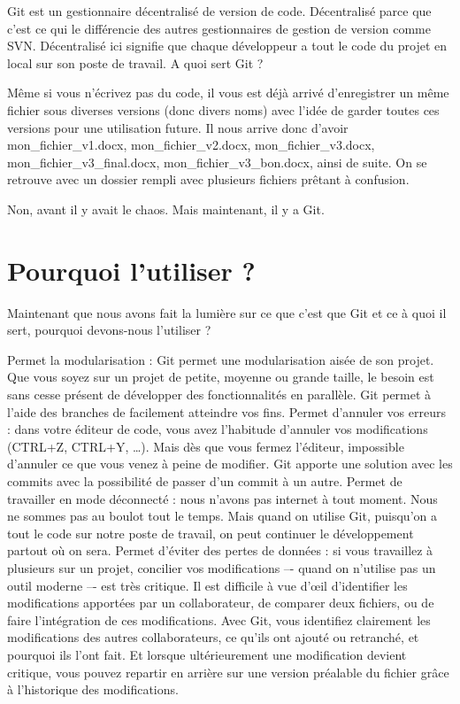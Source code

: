 \documentclass[11pt, a4paper]{book}
\begin{document}
Git est un gestionnaire décentralisé de version de code. Décentralisé parce que c’est ce qui le différencie des autres gestionnaires de gestion de version comme SVN. Décentralisé ici signifie que chaque développeur a tout le code du projet en local sur son poste de travail.
A quoi sert Git ?

Même si vous n’écrivez pas du code, il vous est déjà arrivé d’enregistrer un même fichier sous diverses versions (donc divers noms) avec l’idée de garder toutes ces versions pour une utilisation future. Il nous arrive donc d’avoir mon\_fichier\_v1.docx, mon\_fichier\_v2.docx, mon\_fichier\_v3.docx, mon\_fichier\_v3\_final.docx, mon\_fichier\_v3\_bon.docx, ainsi de suite. On se retrouve avec un dossier rempli avec plusieurs fichiers prêtant à confusion.

Non, avant il y avait le chaos. Mais maintenant, il y a Git.

\section{Pourquoi l’utiliser ?}

Maintenant que nous avons fait la lumière sur ce que c’est que Git et ce à quoi il sert, pourquoi devons-nous l’utiliser ?

    Permet la modularisation : Git permet une modularisation aisée de son projet. Que vous soyez sur un projet de petite, moyenne ou grande taille, le besoin est sans cesse présent de développer des fonctionnalités en parallèle. Git permet à l’aide des branches de facilement atteindre vos fins.
    Permet d’annuler vos erreurs : dans votre éditeur de code, vous avez l’habitude d’annuler vos modifications (CTRL+Z, CTRL+Y, …). Mais dès que vous fermez l’éditeur, impossible d’annuler ce que vous venez à peine de modifier. Git apporte une solution avec les commits avec la possibilité de passer d’un commit à un autre.
    Permet de travailler en mode déconnecté : nous n’avons pas internet à tout moment. Nous ne sommes pas au boulot tout le temps. Mais quand on utilise Git, puisqu’on a tout le code sur notre poste de travail, on peut continuer le développement partout où on sera.
    Permet d’éviter des pertes de données : si vous travaillez à plusieurs sur un projet, concilier vos modifications –- quand on n’utilise pas un outil moderne –- est très critique. Il est difficile à vue d’œil d’identifier les modifications apportées par un collaborateur, de comparer deux fichiers, ou de faire l’intégration de ces modifications. Avec Git, vous identifiez clairement les modifications des autres collaborateurs, ce qu’ils ont ajouté ou retranché, et pourquoi ils l’ont fait. Et lorsque ultérieurement une modification devient critique, vous pouvez repartir en arrière sur une version préalable du fichier grâce à l’historique des modifications.
\end{document}
